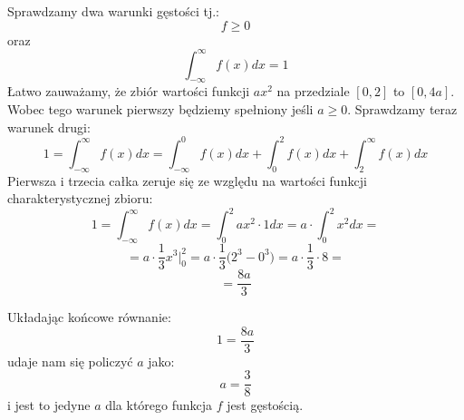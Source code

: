 \documentclass{article}
\begin{document}
Sprawdzamy dwa warunki gęstości tj.:
\begin{equation*}
    f \geq 0
\end{equation*}
oraz
\begin{equation*}
    \int_{-\infty}^{\infty} f(x)dx = 1
\end{equation*}
Łatwo zauważamy, że zbiór wartości funkcji \(ax^2\) na przedziale \([0,2]\) to \([0, 4a]\).
Wobec tego warunek pierwszy będziemy spełniony jeśli \(a \geq 0\). Sprawdzamy teraz warunek drugi:
\begin{equation*}
    1 = \int_{-\infty}^{\infty} f(x)dx = \int_{-\infty}^{0} f(x)dx + \int_{0}^{2} f(x)dx + \int_{2}^{\infty} f(x)dx
\end{equation*}
Pierwsza i trzecia całka zeruje się ze względu na wartości funkcji charakterystycznej zbioru:
\begin{equation*}
    1 = \int_{-\infty}^{\infty} f(x)dx = \int_{0}^{2} ax^{2} \cdot 1 dx = a \cdot \int_{0}^{2} x^{2} dx = 
\end{equation*}
\begin{equation*}
    = a \cdot \frac{1}{3}x^{3} \Bigg\rvert_{0}^{2} = a \cdot \frac{1}{3}\Bigg(2^{3} - 0^{3}\Bigg) = a \cdot \frac{1}{3} \cdot 8 =
\end{equation*}
\begin{equation*}
    = \frac{8a}{3}
\end{equation*}

Układając końcowe równanie:
\begin{equation*}
    1 = \frac{8a}{3}
\end{equation*}
udaje nam się policzyć \(a\) jako:
\begin{equation*}
    a = \frac{3}{8}
\end{equation*}
i jest to jedyne \(a\) dla którego funkcja \(f\) jest gęstością.
\end{document}

